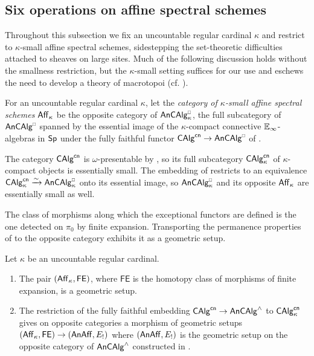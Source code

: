\subsection{Six operations on affine spectral schemes}\label{subsec: six functors on affines}
Throughout this subsection we fix an uncountable regular cardinal $\kappa$ and restrict to $\kappa$-small affine spectral schemes, sidestepping the set-theoretic difficulties attached to sheaves on large sites. Much of the following discussion holds without the smallness restriction, but the $\kappa$-small setting suffices for our use and eschews the need to develop a theory of macrotopoi (cf. \cite[App. A]{DiracII}).
\begin{definition}\label{def: kappa small rings}
    For an uncountable regular cardinal $\kappa$, let the \emph{category of $\kappa$-small affine spectral schemes} $\mathsf{Aff}_{\kappa}$ be the opposite category of $\An\CAlg_{\kappa}^{\sld}$, the full subcategory of $\An\CAlg^{\sld}$ spanned by the essential image of the $\kappa$-compact connective $\mathbb{E}_{\infty}$-algebras in $\mathsf{Sp}$ under the fully faithful functor $\CAlg^{\cn}\to\An\CAlg^{\sld}$ of . 
\end{definition}
\begin{remark}\label{rmk: affine spectral schemes essentially small}
    The category $\mathsf{CAlg}^{\mathsf{cn}}$ is $\omega$-presentable by , so its full subcategory $\mathsf{CAlg}^{\mathsf{cn}}_{\kappa}$ of $\kappa$-compact objects is essentially small. The embedding of  restricts to an equivalence $\CAlg^{\cn}_{\kappa}\xrightarrow{\sim}\An\CAlg^{\sld}_{\kappa}$ onto its essential image, so $\An\CAlg^{\sld}_{\kappa}$ and its opposite $\mathsf{Aff}_{\kappa}$ are essentially small as well.
\end{remark}
The class of morphisms along which the exceptional functors are defined is the one detected on $\pi_{0}$ by finite expansion. Transporting the permanence properties of  to the opposite category exhibits it as a geometric setup.
\begin{lemma}\label{lem: morphism of geometric setups}
    Let $\kappa$ be an uncountable regular cardinal. 
    \begin{enumerate}
        \item The pair $(\mathsf{Aff}_{\kappa},\mathsf{FE})$, where $\mathsf{FE}$ is the homotopy class of morphisms of finite expansion, is a geometric setup. 
        \item The restriction of the fully faithful embedding $\mathsf{CAlg}^{\mathsf{cn}}\to\mathsf{An}\mathsf{CAlg}^{\wedge}$ to $\mathsf{CAlg}^{\mathsf{cn}}_{\kappa}$ gives on opposite categories a morphism of geometric setups $(\mathsf{Aff}_{\kappa},\mathsf{FE})\to(\mathsf{An}\mathsf{Aff},E_{!})$ where $(\mathsf{An}\mathsf{Aff},E_{!})$ is the geometric setup on the opposite category of $\mathsf{An}\mathsf{CAlg}^{\wedge}$ constructed in . 
    \end{enumerate}
\end{lemma}
